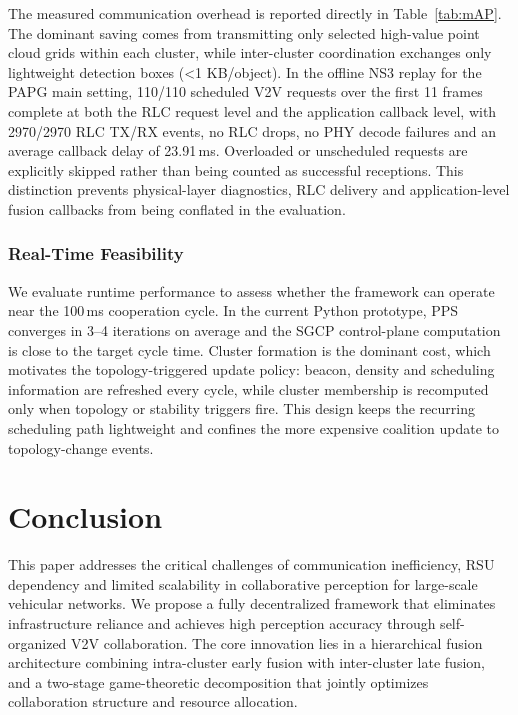 \documentclass[conference]{IEEEtran}
\begin{document}
The measured communication overhead is reported directly in Table~\ref{tab:mAP}. The dominant saving comes from transmitting only selected high-value point cloud grids within each cluster, while inter-cluster coordination exchanges only lightweight detection boxes (\textless 1 KB/object). In the offline NS3 replay for the PAPG main setting, 110/110 scheduled V2V requests over the first 11 frames complete at both the RLC request level and the application callback level, with 2970/2970 RLC TX/RX events, no RLC drops, no PHY decode failures and an average callback delay of 23.91\,ms. Overloaded or unscheduled requests are explicitly skipped rather than being counted as successful receptions. This distinction prevents physical-layer diagnostics, RLC delivery and application-level fusion callbacks from being conflated in the evaluation.

\subsubsection{Real-Time Feasibility}
We evaluate runtime performance to assess whether the framework can operate near the 100\,ms cooperation cycle. In the current Python prototype, PPS converges in 3--4 iterations on average and the SGCP control-plane computation is close to the target cycle time. Cluster formation is the dominant cost, which motivates the topology-triggered update policy: beacon, density and scheduling information are refreshed every cycle, while cluster membership is recomputed only when topology or stability triggers fire. This design keeps the recurring scheduling path lightweight and confines the more expensive coalition update to topology-change events.


\section{Conclusion}

This paper addresses the critical challenges of communication inefficiency, RSU dependency and limited scalability in collaborative perception for large-scale vehicular networks. We propose a fully decentralized framework that eliminates infrastructure reliance and achieves high perception accuracy through self-organized V2V collaboration. The core innovation lies in a hierarchical fusion architecture combining intra-cluster early fusion with inter-cluster late fusion, and a two-stage game-theoretic decomposition that jointly optimizes collaboration structure and resource allocation.
\end{document}
